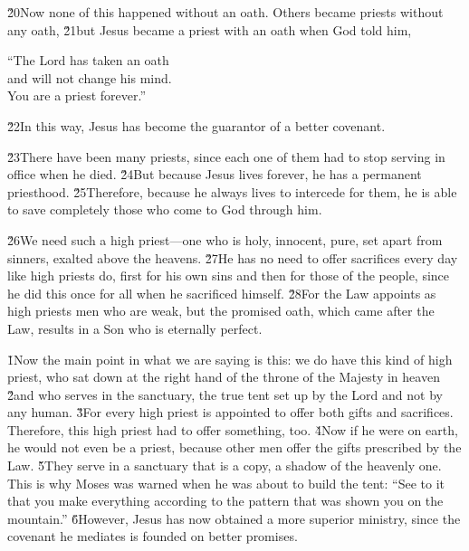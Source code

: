 \v{20}Now none of this happened without an oath. Others became priests without any oath, \v{21}but Jesus became a priest with an oath when God told him,

\begin{poetry}
\poeml ``The Lord has taken an oath \\
\poemll    and will not change his mind. \\
\poeml You are a priest forever.''
\end{poetry}

\v{22}In this way, Jesus has become the guarantor of a better covenant.

\v{23}There have been many priests, since each one of them had to stop serving in office when he died. \v{24}But because Jesus lives forever, he has a permanent priesthood. \v{25}Therefore, because he always lives to intercede for them, he is able to save completely those who come to God through him.

\v{26}We need such a high priest---one who is holy, innocent, pure, set apart from sinners, exalted above the heavens. \v{27}He has no need to offer sacrifices every day like high priests do, first for his own sins and then for those of the people, since he did this once for all when he sacrificed himself. \v{28}For the Law appoints as high priests men who are weak, but the promised oath, which came after the Law, results in a Son who is eternally perfect.

\v{1}Now the main point in what we are saying is this: we do have this kind of high priest, who sat down at the right hand of the throne of the Majesty in heaven \v{2}and who serves in the sanctuary, the true tent set up by the Lord and not by any human. \v{3}For every high priest is appointed to offer both gifts and sacrifices. Therefore, this high priest had to offer something, too. \v{4}Now if he were on earth, he would not even be a priest, because other men offer the gifts prescribed by the Law. \v{5}They serve in a sanctuary that is a copy, a shadow of the heavenly one. This is why Moses was warned when he was about to build the tent: ``See to it that you make everything according to the pattern that was shown you on the mountain.'' \v{6}However, Jesus has now obtained a more superior ministry, since the covenant he mediates is founded on better promises.

